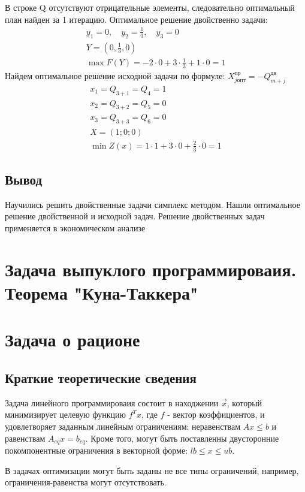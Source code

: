 \documentclass[a4paper, 12pt]{article}
\begin{document}
В строке Q отсутствуют отрицательные элементы, следовательно оптимальный план найден за 1 итерацию. Оптимальное решение двойственно задачи: 
\begin{align*}
  y_1=0,\quad y_2=\frac{1}{3},\quad y_3=0\\
  Y=(0,\frac{1}{3},0)\\
  \max F(Y) = -2\cdot0+3\cdot\frac{1}{3}+1\cdot0 = 1
\end{align*}
Найдем оптимальное решение исходной задачи по формуле: $X_{j\text{опт}}^{\text{пр}} = -Q_{m+j}^{\text{дв}}$
\begin{align}
  x_1=Q_{3+1}=Q_4=1\\
  x_2=Q_{3+2}=Q_5=0\\
  x_3=Q_{3+3}=Q_6=0\\
  X=(1;0;0)\\
  \min Z(x)=1\cdot 1+3\cdot0+\frac{2}{3}\cdot0 = 1
\end{align}
\subsection{Вывод}
Научились решить двойственные задачи симплекс методом. Нашли оптимальное решение двойственной и исходной задач. Решение двойственных задач применяется в экономическом анализе

\newpage
\section{Задача выпуклого программироваия. Теорема "Куна-Таккера"}

\newpage
\section{Задача о рационе}
\subsection{Краткие теоретические сведения}
Задача линейного программироваия состоит в находжении $\vec{x}$, который минимизирует целевую функцию $f^Tx$, где $f$ - вектор коэффициентов, и удовлетворяет заданным линейным ограничениям: неравенствам $Ax\leq b$ и равенствам $A_{eq}x = b_{eq}$. Кроме того, могут быть поставленны двусторонние покомпонентные ограничения в векторной форме: $lb\leq x \leq ub$.

В задачах оптимизации могут быть заданы не все типы ограничений, например, ограничения-равенства могут отсутствовать.
\end{document}
